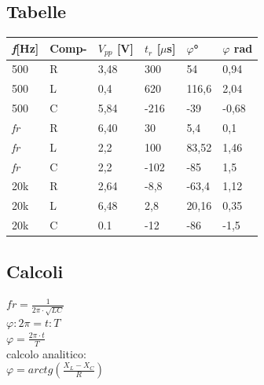 \documentclass[12pt]{article}
\begin{document}
    \FloatBarrier
\subsection{Tabelle}    
\vspace{1cm}        

\begin{table}[!h]
        
            
        \begin{tabular}{|p{2cm}|p{2cm}|p{2cm}|p{2cm}|p{2cm}|p{2cm}|}
            \hline
            \rowcolor{BurntOrange} \textit{f}[Hz] & Comp- & $V_{pp}$ [V] & $t_r$ [$\mu$s] & $\varphi$° &  $\varphi$ rad\\
            \hline
            \rowcolor{Apricot} 500 & R & 3,48 & 300 & 54 & 0,94\\
            \hline
            \rowcolor{Apricot} 500 & L & 0,4 & 620 & 116,6 & 2,04\\
            \hline
            \rowcolor{Apricot} 500 & C & 5,84 & -216 & -39 & -0,68\\
            \hline
            \rowcolor{Peach} \textit{fr} & R & 6,40 & 30 & 5,4 & 0,1\\
            \hline
            \rowcolor{Peach} \textit{fr} & L & 2,2 & 100 & 83,52 & 1,46\\
            \hline
            \rowcolor{Peach} \textit{fr} & C & 2,2 & -102  & -85 & 1,5\\
            \hline
            \rowcolor{Apricot}  20k & R & 2,64 & -8,8 & -63,4 & 1,12\\
            \hline
            \rowcolor{Apricot} 20k & L & 6,48 & 2,8 & 20,16 &0,35\\
            \hline
            \rowcolor{Apricot} 20k & C & 0.1 & -12 & -86 & -1,5\\
            \hline
            
        \end{tabular}
        
         
    \end{table}
   
    \subsection{Calcoli}
$fr=\frac{1}{2\pi\cdot\sqrt{LC}}$\\
$\varphi:2\pi=t:T$ \\
$\varphi=\frac{2\pi \cdot t}{T}$\\
calcolo analitico:\\
$\varphi=arctg(\frac{X_L - X_C}{R})$
\end{document}
